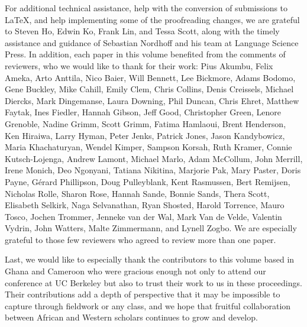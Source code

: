 \begin{refsection}
For additional technical assistance, help with the conversion of submissions to \LaTeX, and help implementing some of the proofreading changes, we are grateful to Steven Ho, Edwin Ko, Frank Lin, and Tessa Scott, along with the timely assistance and guidance of Sebastian Nordhoff and his team at Language Science Press. In addition, each paper in this volume benefited from the comments of reviewers, who we would like to thank for their work: Pius Akumbu, Felix Ameka, Arto Anttila, Nico Baier, Will Bennett, Lee Bickmore, Adams Bodomo, Gene Buckley, Mike Cahill, Emily Clem, Chris Collins, Denis Creissels, Michael Diercks, Mark Dingemanse, Laura Downing, Phil Duncan, Chris Ehret, Matthew Faytak, Ines Fiedler, Hannah Gibson, Jeff Good, Christopher Green, Lenore Grenoble, Nadine Grimm, Scott Grimm, Fatima Hamlaoui, Brent Henderson, Ken Hiraiwa, Larry Hyman, Peter Jenks, Patrick Jones, Jason Kandybowicz, Maria Khachaturyan, Wendel Kimper, Sampson Korsah, Ruth Kramer, Connie Kutsch-Lojenga, Andrew Lamont, Michael Marlo, Adam McCollum, John Merrill, Irene Monich, Deo Ngonyani, Tatiana Nikitina, Marjorie Pak, Mary Paster, Doris Payne, G\'erard Phillipson, Doug Pulleyblank, Kent Rasmussen, Bert Remijsen, Nicholas Rolle, Sharon Rose, Hannah Sande, Bonnie Sands, Thera Scott, Elisabeth Selkirk, Naga Selvanathan, Ryan Shosted, Harold Torrence, Mauro Tosco, Jochen Trommer, Jenneke van der Wal, Mark Van de Velde, Valentin Vydrin, John Watters, Malte Zimmermann, and Lynell Zogbo. We are especially grateful to those few reviewers who agreed to review more than one paper.

Last, we would like to especially thank the contributors to this volume based in Ghana and Cameroon who were gracious enough not only to attend our conference at UC Berkeley but also to trust their work to us in these proceedings. Their contributions add a depth of perspective that it may be impossible to capture through fieldwork or any class, and we hope that fruitful collaboration between African and Western scholars continues to grow and develop.

\printbibliography[heading=subbibliography]
\end{refsection}

